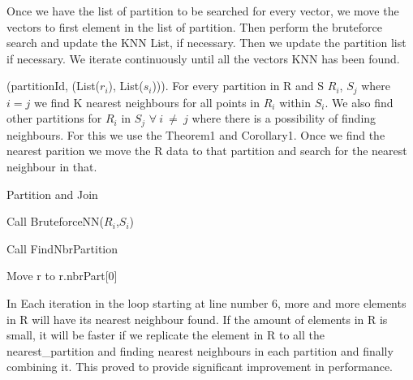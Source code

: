 Once we have the list of partition to be searched for every vector, we
move the vectors to first element in the list of partition. Then
perform the bruteforce search and update the KNN List, if
necessary. Then we update the partition list if necessary. We iterate
continuously until all the vectors KNN has been found.

(partitionId,
(List($r_i$), List($s_i$))). For every partition in R and S $R_i$,
$S_j$ where $i=j$ we find K nearest neighbours for all points in
$R_i$ within $S_i$. We also find other partitions for $R_i$ in $S_j$
$\forall\ i\ \neq\ j$ where there is a possibility of finding
neighbours. For this we use the Theorem1 and Corollary1.
Once we find the nearest parition we move the R data to that partition
and search for the nearest neighbour in that.

\begin{algorithm}
  \caption{Partition and Join}
  \label{algo_join}
  \begin{algorithmic}[1]
    \REPEAT

    \STATE Call BruteforceNN($R_i$,$S_i$)
    \ENDFOR

    \STATE Call FindNbrPartition

    \STATE Move r to r.nbrPart[0]
    \ENDFOR


  \end{algorithmic}
\end{algorithm}

\bigskip

In Each iteration in the loop starting at line number 6, more and more elements in R will have its nearest
neighbour found. If the amount of elements in R is small, it will be
faster if we replicate the element in R to all the nearest\_partition
and finding nearest neighbours in each partition and finally combining
it. This proved to provide significant improvement in performance.

\bigskip

